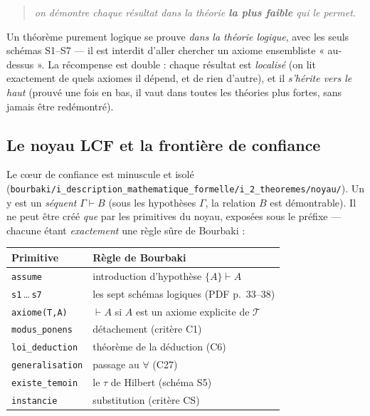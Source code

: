 \begin{quote}
\itshape on démontre chaque résultat dans la théorie \textbf{la plus faible} qui
le permet.
\end{quote}

Un théorème purement logique se prouve \emph{dans la théorie logique}, avec les
seuls schémas S1--S7 --- il est interdit d'aller chercher un axiome ensembliste
« au-dessus ». La récompense est double : chaque résultat est \emph{localisé}
(on lit exactement de quels axiomes il dépend, et de rien d'autre), et il
\emph{s'hérite vers le haut} (prouvé une fois en bas, il vaut dans toutes les
théories plus fortes, sans jamais être redémontré).

\subsection*{Le noyau LCF et la frontière de confiance}

Le c\oe ur de confiance est minuscule et isolé
(\texttt{bourbaki/i\_description\_mathematique\_formelle/i\_2\_theoremes/noyau/}). Un \theoreme{} y est un
\emph{séquent} $\Gamma \vdash B$ (sous les hypothèses $\Gamma$, la relation $B$
est démontrable). Il ne peut être créé \emph{que} par les primitives du noyau,
exposées sous le préfixe \Nstar{} --- chacune étant \emph{exactement} une règle
sûre de Bourbaki :

\begin{center}\small
\begin{tabular}{@{}ll@{}}
\toprule
Primitive \Nstar{} & Règle de Bourbaki \\
\midrule
\texttt{assume} & introduction d'hypothèse $\{A\}\vdash A$ \\
\texttt{s1}\,\ldots\,\texttt{s7} & les sept schémas logiques (PDF p.~33--38) \\
\texttt{axiome(T,A)} & $\vdash A$ si $A$ est un axiome explicite de $\mathcal{T}$ \\
\texttt{modus\_ponens} & détachement (critère C1) \\
\texttt{loi\_deduction} & théorème de la déduction (C6) \\
\texttt{generalisation} & passage au $\forall$ (C27) \\
\texttt{existe\_temoin} & le $\tau$ de Hilbert (schéma S5) \\
\texttt{instancie} & substitution (critère CS) \\
\bottomrule
\end{tabular}
\end{center}

